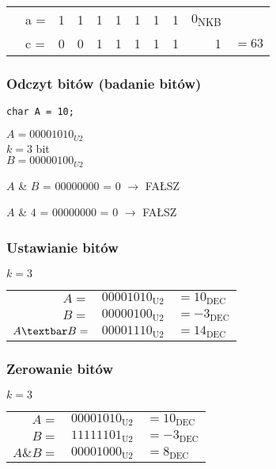 \documentclass[11pt]{article}
\begin{document}
\begin{center}
\begin{tabular}{llrrrrrrrrl}
 & a = & 1 & 1 & 1 & 1 & 1 & 1 & 1 & 0\textsubscript{NKB} & \\
 & c = & 0 & 0 & 1 & 1 & 1 & 1 & 1 & 1 & \(= 63\)\\
\end{tabular}
\end{center}

\subsubsection{Odczyt bitów (badanie bitów)}
\label{sec:org266b739}
\begin{verbatim}
char A = 10;
\end{verbatim}
\(A=00001010_{U2}\) \\
\(k=3\) bit \\
\(B=00000100_{U2}\)

\(A\) \& \(B\) = 00000000\textsubscript{} = 0\textsubscript{} \(\to\) FAŁSZ

\(A\) \& \(4\) = 00000000\textsubscript{} = 0\textsubscript{} \(\to\) FAŁSZ
\subsubsection{Ustawianie bitów}
\label{sec:orgbcfc51f}

\(k=3\)

\begin{center}
\begin{tabular}{rll}
\(A=\) & \(00001010_{\text{U2}}\) & \(= 10_{\text{DEC}}\)\\
\(B=\) & \(00000100_{\text{U2}}\) & \(= -3_{\text{DEC}}\)\\
\hline
\(A \textbar B =\) & \(00001110_{\text{U2}}\) & \(= 14_{\text{DEC}}\)\\
\end{tabular}
\end{center}

\subsubsection{Zerowanie bitów}
\label{sec:org8d250de}

\(k=3\)

\begin{center}
\begin{tabular}{rll}
\(A=\) & \(00001010_{\text{U2}}\) & \(= 10_{\text{DEC}}\)\\
\(B=\) & \(11111101_{\text{U2}}\) & \(= -3_{\text{DEC}}\)\\
\hline
\(A \& B =\) & \(00001000_{\text{U2}}\) & \(= 8_{\text{DEC}}\)\\
\end{tabular}
\end{center}
\end{document}
